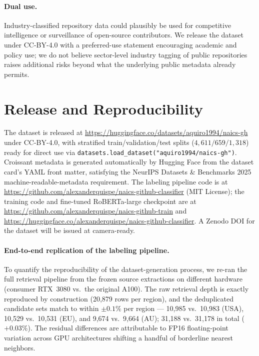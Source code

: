 \documentclass{article}
\begin{document}
\paragraph{Dual use.} Industry-classified repository data could
plausibly be used for competitive intelligence or surveillance of
open-source contributors. We release the dataset under CC-BY-4.0 with a
preferred-use statement encouraging academic and policy use; we do not
believe sector-level industry tagging of public repositories raises
additional risks beyond what the underlying public metadata already
permits.

\section{Release and Reproducibility}
\label{sec:release}

The dataset is released at
\url{https://huggingface.co/datasets/aquiro1994/naics-gh} under
CC-BY-4.0, with stratified train/validation/test splits
($4{,}611 / 659 / 1{,}318$) ready for direct use via
\texttt{datasets.load\_dataset("aquiro1994/naics-gh")}. Croissant
metadata is generated automatically by Hugging Face from the dataset
card's YAML front matter, satisfying the NeurIPS Datasets \&
Benchmarks 2025 machine-readable-metadata requirement. The labeling
pipeline code is at
\url{https://github.com/alexanderquispe/naics-github-classifier} (MIT
License); the training code and fine-tuned RoBERTa-large checkpoint
are at
\url{https://github.com/alexanderquispe/naics-github-train} and
\url{https://huggingface.co/alexanderquispe/naics-github-classifier}.
A Zenodo DOI for the dataset will be issued at camera-ready.

\paragraph{End-to-end replication of the labeling pipeline.}
To quantify the reproducibility of the dataset-generation process, we
re-ran the full retrieval pipeline from the frozen source extractions
on different hardware (consumer RTX~3080 vs.\ the original A100). The
raw retrieval depth is exactly reproduced by construction
(20{,}879 rows per region), and the deduplicated candidate sets match
to within $\pm 0.1\%$ per region --- 10{,}985 vs.\ 10{,}983 (USA),
10{,}529 vs.\ 10{,}531 (EU), and 9{,}674 vs.\ 9{,}664 (AU); 31{,}188
vs.\ 31{,}178 in total ($+0.03\%$). The residual differences are
attributable to FP16 floating-point variation across GPU
architectures shifting a handful of borderline nearest neighbors.
\end{document}
